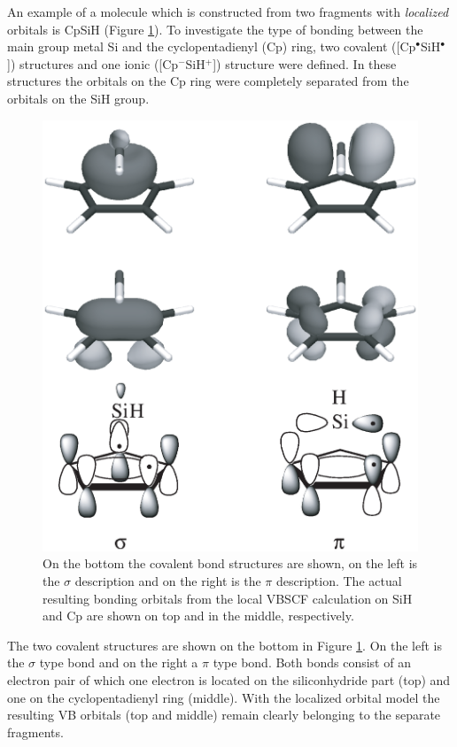 An example of a molecule which is constructed from two fragments with \textit{localized} orbitals is CpSiH (Figure \ref{ch1.fig7}). To investigate the type of bonding between the main group metal Si and the cyclopentadienyl (Cp) ring, two covalent ([Cp$^\bullet$SiH$^\bullet$]) structures and one ionic ([Cp$^{-}$SiH$^{+}$]) structure were defined. In these structures the orbitals on the Cp ring were completely separated from the orbitals on the SiH group.
\begin{figure}[htbp]
\center
\includegraphics[scale=0.5]{introduction/figures/figure7.eps}
\caption{On the bottom the covalent bond structures are shown, on the left is the $\sigma$ description and on the right is the $\pi$ description. The actual resulting bonding orbitals from the local VBSCF calculation on SiH and Cp are shown on top and in the middle, respectively.}
\label{ch1.fig7}
\end{figure}
The two covalent structures are shown on the bottom in Figure \ref{ch1.fig7}. On the left is the $\sigma$ type bond and on the right a $\pi$ type bond. Both bonds consist of an electron pair of which one electron is located on the siliconhydride part (top) and one on the cyclopentadienyl ring (middle). With the localized orbital model the resulting VB orbitals (top and middle) remain clearly belonging to the separate fragments. 

